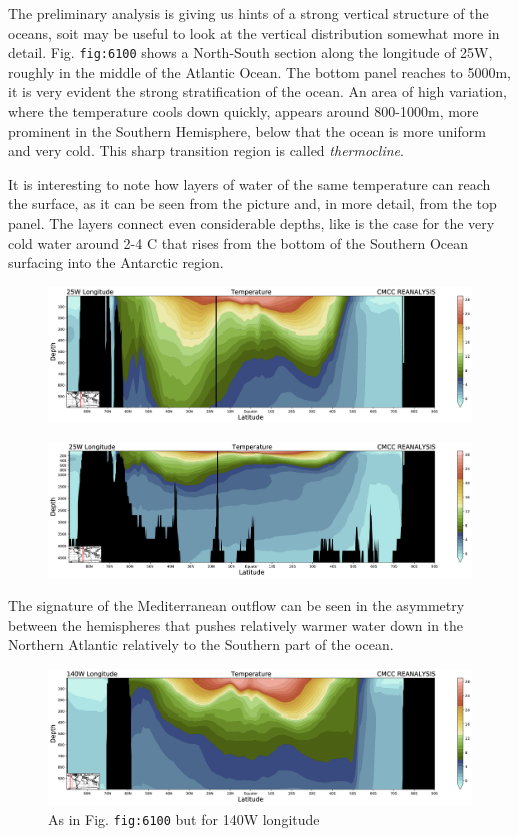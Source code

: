 The preliminary analysis is giving us hints of a strong vertical
structure of the oceans, soit may be useful to look at the vertical
distribution somewhat more in detail. Fig. \texttt{fig:6100} shows a
North-South section along the longitude of 25W, roughly in the middle of
the Atlantic Ocean. The bottom panel reaches to 5000m, it is very
evident the strong stratification of the ocean. An area of high
variation, where the temperature cools down quickly, appears around
800-1000m, more prominent in the Southern Hemisphere, below that the
ocean is more uniform and very cold. This sharp transition region is
called \emph{thermocline}.

It is interesting to note how layers of water of the same temperature
can reach the surface, as it can be seen from the picture and, in more
detail, from the top panel. The layers connect even considerable depths,
like is the case for the very cold water around 2-4 C that rises from
the bottom of the Southern Ocean surfacing into the Antarctic region.

\begin{figure}
	\centering
	\includegraphics[width = .7 \textwidth]{figs/GD/Sect25W1000.png}
	\caption{} \label{fig:}
\end{figure}

\begin{figure}
	\centering
	\includegraphics[width = .7 \textwidth]{figs/GD/Sect25W5000.png}
	\caption{} \label{fig:}
\end{figure}

The signature of the Mediterranean outflow can be seen in the asymmetry
between the hemispheres that pushes relatively warmer water down in the
Northern Atlantic relatively to the Southern part of the ocean.

\begin{figure}
	\centering
	\includegraphics[width = .7 \textwidth]{figs/GD/Sect140W1000.png}
	\caption{As in Fig. \texttt{fig:6100} but for 140W longitude}
\end{figure}

